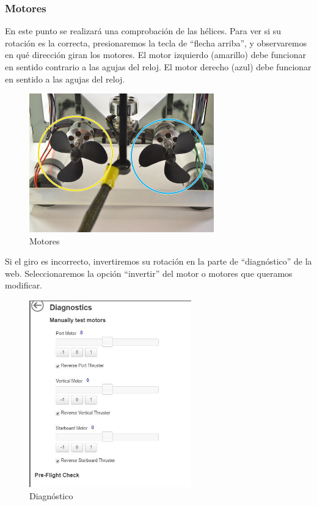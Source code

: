 \subsubsection{Motores}
\label{subsubsec:motores}
En este punto se realizará una comprobación de las hélices. Para ver si su rotación es la correcta, presionaremos la tecla de “flecha arriba”, y observaremos en qué dirección giran los motores.
El motor izquierdo (amarillo) debe funcionar en sentido contrario a las agujas del reloj.
El motor derecho (azul) debe funcionar en sentido a las agujas del reloj.
\begin{figure} [hbtp]
\begin{center}
  \includegraphics[width=8cm]{img/cap3/3_4/motores}
\end{center}
\caption{Motores}
\label{fig:motores}
\end{figure}

Si el giro es incorrecto, invertiremos su rotación en la parte de “diagnóstico” de la web. Seleccionaremos la opción “invertir” del motor o motores que queramos modificar.

\begin{figure} [hbtp]
\begin{center}
  \includegraphics[width=7cm]{img/cap3/3_4/diagnostic}
\end{center}
\caption{Diagnóstico}
\label{fig:diagnostics}
\end{figure} 

